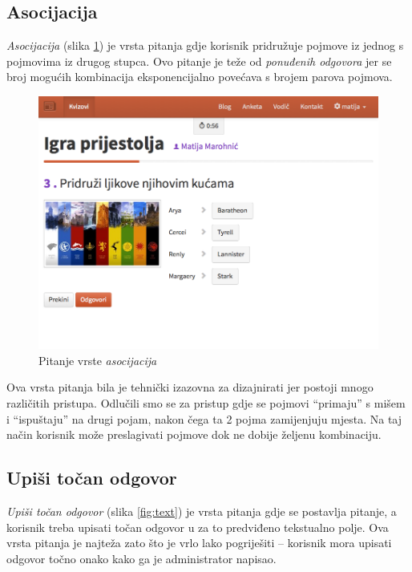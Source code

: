 \documentclass[11pt]{scrreprt}
\begin{document}
\subsection{Asocijacija}

\emph{Asocijacija} (slika \ref{fig:association}) je vrsta pitanja gdje korisnik
pridružuje pojmove iz jednog s pojmovima iz drugog stupca. Ovo pitanje je teže
od \emph{ponuđenih odgovora} jer se broj mogućih kombinacija eksponencijalno
povećava s brojem parova pojmova.

\begin{figure}[H]
  \includegraphics[width=\textwidth, clip=true, trim=0 3cm 0 0, fbox]{student/association_question}
  \caption{Pitanje vrste \emph{asocijacija}}
  \label{fig:association}
\end{figure}

Ova vrsta pitanja bila je tehnički izazovna za dizajnirati jer postoji mnogo
različitih pristupa. Odlučili smo se za pristup gdje se pojmovi ``primaju'' s
mišem i ``ispuštaju'' na drugi pojam, nakon čega ta 2 pojma zamijenjuju mjesta.
Na taj način korisnik može preslagivati pojmove dok ne dobije željenu
kombinaciju.

\subsection{Upiši točan odgovor}

\emph{Upiši točan odgovor} (slika \ref{fig:text}) je vrsta pitanja gdje se
postavlja pitanje, a korisnik treba upisati točan odgovor u za to predviđeno
tekstualno polje. Ova vrsta pitanja je najteža zato što je vrlo lako pogriješiti
-- korisnik mora upisati odgovor točno onako kako ga je administrator napisao.
\end{document}
